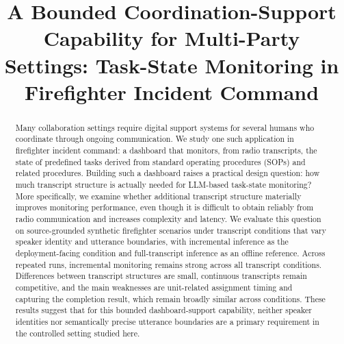 \documentclass[11pt]{article}
\title{A Bounded Coordination-Support Capability for Multi-Party Settings: Task-State Monitoring in Firefighter Incident Command}
\author{David Grünert \and Barbara Morgenstern \and Florian Peczinka \\
\textbf{\and Dario Holenstein \and Roland Brunner \and Alexandre de Spindler} \\
Zurich University of Applied Sciences, Winterthur, Switzerland \\
\texttt{\{grud,desa\}@zhaw.ch},\texttt{\{morgebar,pecziflo,holendar\}@students.zhaw.ch} \\
Freiwillige Feuerwehr Stadt Zug, Zug, Switzerland \\
\texttt{roland.brunner@stadtzug.ch}}
\begin{document}
\maketitle
\begin{abstract}
  Many collaboration settings require digital support systems for several humans who coordinate through ongoing communication. We study one such application in firefighter incident command: a dashboard that monitors, from radio transcripts, the state of predefined tasks derived from standard operating procedures (SOPs) and related procedures.
  Building such a dashboard raises a practical design question: how much transcript structure is actually needed for LLM-based task-state monitoring? More specifically, we examine whether additional transcript structure materially improves monitoring performance, even though it is difficult to obtain reliably from radio communication and increases complexity and latency.
  We evaluate this question on source-grounded synthetic firefighter scenarios under transcript conditions that vary speaker identity and utterance boundaries, with incremental inference as the deployment-facing condition and full-transcript inference as an offline reference.
  Across repeated runs, incremental monitoring remains strong across all transcript conditions. Differences between transcript structures are small, continuous transcripts remain competitive, and the main weaknesses are unit-related assignment timing and capturing the completion result, which remain broadly similar across conditions.
  These results suggest that for this bounded dashboard-support capability, neither speaker identities nor semantically precise utterance boundaries are a primary requirement in the controlled setting studied here.
\end{abstract}








\clearpage


\end{document}
